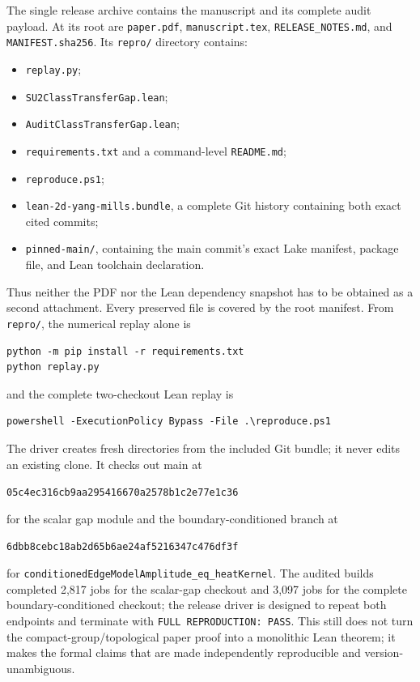 \documentclass[11pt]{article}
\theoremstyle{remark}
\begin{document}
The single release archive contains the manuscript and its complete audit
payload.  At its root are \texttt{paper.pdf}, \texttt{manuscript.tex},
\texttt{RELEASE\_NOTES.md}, and \texttt{MANIFEST.sha256}.  Its
\texttt{repro/} directory contains:
\begin{itemize}[leftmargin=8mm,nosep]
\item \texttt{replay.py};
\item \texttt{SU2ClassTransferGap.lean};
\item \texttt{AuditClassTransferGap.lean};
\item \texttt{requirements.txt} and a command-level \texttt{README.md};
\item \texttt{reproduce.ps1};
\item \texttt{lean-2d-yang-mills.bundle}, a complete Git history containing
both exact cited commits;
\item \texttt{pinned-main/}, containing the main commit's exact Lake manifest,
package file, and Lean toolchain declaration.
\end{itemize}
Thus neither the PDF nor the Lean dependency snapshot has to be obtained as a
second attachment.  Every preserved file is covered by the root manifest.
From \texttt{repro/}, the numerical replay alone is
\begin{verbatim}
python -m pip install -r requirements.txt
python replay.py
\end{verbatim}
and the complete two-checkout Lean replay is
\begin{verbatim}
powershell -ExecutionPolicy Bypass -File .\reproduce.ps1
\end{verbatim}
The driver creates fresh directories from the included Git bundle; it never
edits an existing clone.  It checks out main at
\begin{center}
\texttt{05c4ec316cb9aa295416670a2578b1c2e77e1c36}
\end{center}
for the scalar gap module and the boundary-conditioned branch at
\begin{center}
\texttt{6dbb8cebc18ab2d65b6ae24af5216347c476df3f}
\end{center}
for \nolinkurl{conditionedEdgeModelAmplitude_eq_heatKernel}.  The audited
builds completed 2,817 jobs for the scalar-gap checkout and 3,097 jobs for the
complete boundary-conditioned checkout; the release driver is designed to
repeat both endpoints and terminate with \texttt{FULL REPRODUCTION: PASS}.
This still does not turn the compact-group/topological paper proof into a
monolithic Lean theorem; it makes the formal claims that are made independently
reproducible and version-unambiguous.
\end{document}

